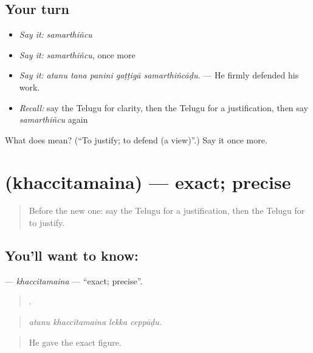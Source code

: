 \subsection*{Your turn}
\begin{itemize}
\raggedright
  \item \emph{Say it:} \emph{samarthiñcu}
  \item \emph{Say it:} \emph{samarthiñcu}, once more
  \item \emph{Say it:} \emph{atanu tana panini gaṭṭigā samarthiñcāḍu.} — He firmly defended his work.
  \item \emph{Recall:} say the Telugu for clarity, then the Telugu for a justification, then say \emph{samarthiñcu} again
\end{itemize}

\begin{tcolorbox}[breakable,colback=teal!4,colframe=teal!35!black,title={Before you move on}]
What does  mean? (\textquotedblleft{}To justify; to defend (a view)\textquotedblright{}.) Say it once more.
\end{tcolorbox}
\section[\texorpdfstring{\te{ఖచ్చితమైన} (khaccitamaina)}{ఖచ్చితమైన (khaccitamaina)}]{ (khaccitamaina) — exact; precise}

\label{lesson:TE-C394-khaccitamaina}



\begin{quote}
Before the new one: say the Telugu for a justification, then the Telugu for to justify.
\end{quote}

\subsection*{You'll want to know: }
\textbf{} — \emph{khaccitamaina} — \textquotedblleft{}exact; precise\textquotedblright{}.

\begin{quote}
   .
\end{quote}

\begin{quote}
\emph{atanu khaccitamaina lekka ceppāḍu.}
\end{quote}

\begin{quote}
He gave the exact figure.
\end{quote}

